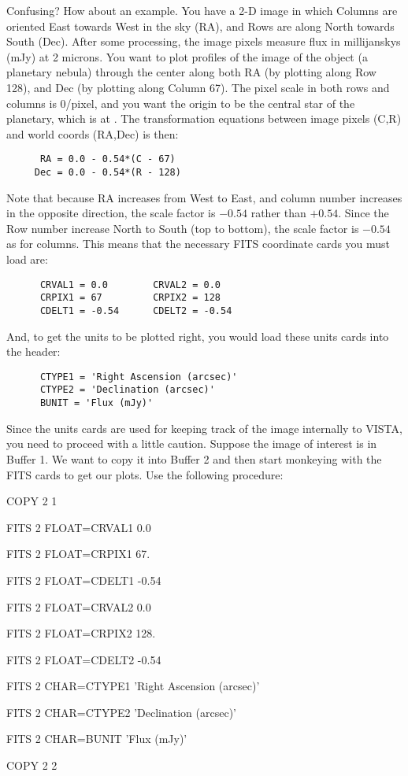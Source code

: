 Confusing?  How about an example.  You have a 2-D image in which Columns are
oriented East towards West in the sky (RA), and Rows are along North towards
South (Dec).  After some processing, the image pixels measure flux in
millijanskys (mJy) at 2 microns.  You want to plot profiles of the image of
the object (a planetary nebula) through the center along both RA (by plotting
along Row 128), and Dec (by plotting along Column 67).  The pixel scale in
both rows and columns is 0/pixel, and you want the origin to be
the central star of the planetary, which is at .  The
transformation equations between image pixels (C,R) and world coords (RA,Dec)
is then:
\begin{verbatim}
      RA = 0.0 - 0.54*(C - 67)
     Dec = 0.0 - 0.54*(R - 128)
\end{verbatim}
Note that because RA increases from West to East, and column number increases
in the opposite direction, the scale factor is $-0.54$ rather than $+0.54$.
Since the Row number increase North to South (top to bottom), the scale factor
is $-0.54$ as for columns.  This means that the necessary FITS coordinate
cards you must load are:
\begin{verbatim}
      CRVAL1 = 0.0        CRVAL2 = 0.0
      CRPIX1 = 67         CRPIX2 = 128
      CDELT1 = -0.54      CDELT2 = -0.54
\end{verbatim}
And, to get the units to be plotted right, you would load these units cards
into the header:
\begin{verbatim}
      CTYPE1 = 'Right Ascension (arcsec)'
      CTYPE2 = 'Declination (arcsec)'
      BUNIT = 'Flux (mJy)'
\end{verbatim}

Since the units cards are used for keeping track of the image internally
to VISTA, you need to proceed with a little caution.  Suppose the
image of interest is in Buffer 1.  We want to copy it into Buffer 2
and then start monkeying with the FITS cards to get our plots.  Use the
following procedure:

\begin{command}
      \item COPY 2 1
      \item FITS 2 FLOAT=CRVAL1 0.0
      \item FITS 2 FLOAT=CRPIX1 67.
      \item FITS 2 FLOAT=CDELT1 -0.54
      \item FITS 2 FLOAT=CRVAL2 0.0
      \item FITS 2 FLOAT=CRPIX2 128.
      \item FITS 2 FLOAT=CDELT2 -0.54
      \item FITS 2 CHAR=CTYPE1 'Right Ascension (arcsec)'
      \item FITS 2 CHAR=CTYPE2 'Declination (arcsec)'
      \item FITS 2 CHAR=BUNIT 'Flux (mJy)'
      \item COPY 2 2
\end{command}

